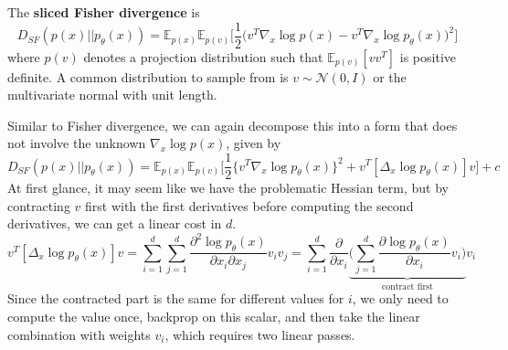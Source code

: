     \begin{definition}
      The \textbf{sliced Fisher divergence} is 
      \begin{equation}
        D_{SF} (p(x) || p_\theta (x)) = \mathbb{E}_{p(x)} \mathbb{E}_{p(v)} \bigg[ \frac{1}{2} \big( v^T \nabla_x \log p (x) - v^T \nabla_x \log p_\theta (x) \big)^2 \bigg]
      \end{equation}
      where $p(v)$ denotes a projection distribution such that $\mathbb{E}_{p(v)} [v v^T]$ is positive definite. A common distribution to sample from is $v \sim \mathcal{N}(0, I)$ or the multivariate normal with unit length. 
    \end{definition} 

    Similar to Fisher divergence, we can again decompose this into a form that does not involve the unknown $\nabla_x \log p(x)$, given by 
    \begin{equation}
      D_{SF} (p(x) || p_\theta(x)) = \mathbb{E}_{p(x)} \mathbb{E}_{p(v)} \bigg[ \frac{1}{2} \{ v^T \nabla_x \log p_\theta (x) \}^2 + v^T [\Delta_x \log p_\theta (x)]v \bigg] + c
    \end{equation}
    At first glance, it may seem like we have the problematic Hessian term, but by contracting $v$ first with the first derivatives before computing the second derivatives, we can get a linear cost in $d$. 
    \begin{equation}
      v^T [\Delta_x \log p_\theta (x)]v = \sum_{i=1}^d \sum_{j=1}^d \frac{\partial^2 \log p_\theta (x)}{\partial x_i \partial x_j} v_i v_j = \sum_{i=1}^d \frac{\partial}{\partial x_i} \underbrace{\bigg( \sum_{j=1}^d \frac{\partial \log p_\theta (x)}{\partial x_i} v_i \bigg)}_{\text{contract first}} v_i
    \end{equation}
    Since the contracted part is the same for different values for $i$, we only need to compute the value once, backprop on this scalar, and then take the linear combination with weights $v_i$, which requires two linear passes. 

